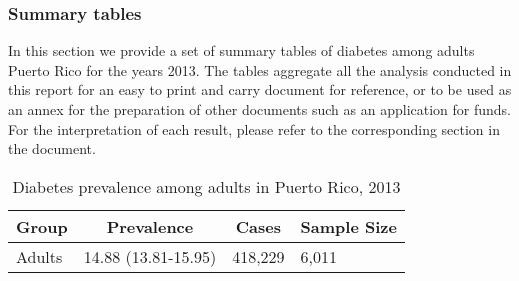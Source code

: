 \newpage
\subsubsection{Summary tables}
In this section we provide a set of summary tables of diabetes among adults Puerto Rico for the years 2013. The tables aggregate all the analysis conducted in this report for an easy to print and carry document for reference, or to be used as an annex for the preparation of other documents such as an application for funds. For the interpretation of each result, please refer to the corresponding section in the document.

\begin{table}[H]
\caption{Diabetes prevalence among adults in Puerto Rico, 2013\label{tab:Overall.tabl.Diabetes.2013}} 
\begin{center}
\begin{tabular}{llll}
\hline\hline
\multicolumn{1}{l}{Group}&\multicolumn{1}{c}{Prevalence}&\multicolumn{1}{c}{Cases}&\multicolumn{1}{c}{Sample Size}\tabularnewline
\hline
Adults&14.88 (13.81-15.95)&418,229&6,011\tabularnewline
\hline
\end{tabular}\end{center}

\end{table}


